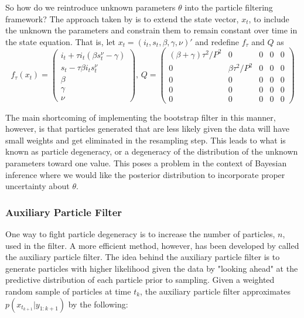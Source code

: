 \documentclass{article}
\begin{document}
So how do we reintroduce unknown parameters $\theta$ into the particle filtering framework?  The approach taken by \citet{skvortsov} is to extend the state vector, $x_t$, to include the unknown the parameters and constrain them to remain constant over time in the state equation.  That is, let $x_t = (i_t,s_t,\beta,\gamma,\nu)'$ and redefine $f_\tau$ and $Q$ as
\[
f_\tau(x_t) = \left(
\begin{array}{c}
i_t + \tau i_t(\beta s^{\nu}_t - \gamma) \\
s_t - \tau\beta i_ts^{\nu}_t \\
\beta \\
\gamma \\
\nu
\end{array}
\right)
\mbox{, }
Q = \left(
\begin{array}{ccccc}
(\beta + \gamma)\tau^2/P^2 & 0 & 0 & 0 & 0 \\
0 & \beta\tau^2/P^2 & 0 & 0 & 0 \\
0 & 0 & 0 & 0 & 0 \\
0 & 0 & 0 & 0 & 0 \\
0 & 0 & 0 & 0 & 0
\end{array}
\right)
 \]

\noindent The main shortcoming of implementing the bootstrap filter in this manner, however, is that particles generated that are less likely given the data will have small weights and get eliminated in the resampling step.  This leads to what is known as particle degeneracy, or a degeneracy of the distribution of the unknown parameters toward one value.  This poses a problem in the context of Bayesian inference where we would like the posterior distribution to incorporate proper uncertainty about $\theta$.

\subsubsection{Auxiliary Particle Filter}

One way to fight particle degeneracy is to increase the number of particles, $n$, used in the filter.  A more efficient method, however, has been developed by \citet{pitt} called the auxiliary particle filter.  The idea behind the auxiliary particle filter is to generate particles with higher likelihood given the data by "looking ahead" at the predictive distribution of each particle prior to sampling.  Given a weighted random sample of particles at time $t_k$, the auxiliary particle filter approximates $p(x_{t_{k+1}}|y_{1:k+1})$ by the following:
\end{document}

